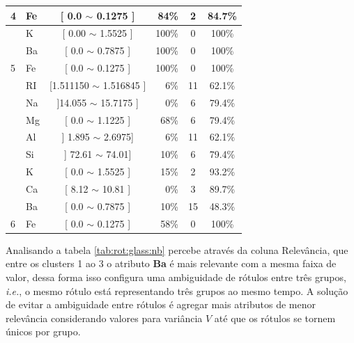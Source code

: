 \begin{table}[!h]
{\begin{tabular}{llcrcc}
\multirow{-5}{*}{4}                          & Fe    & [ 0.0 $\sim$  0.1275 ]    & 84\%  & 2  & 84.7\% \\  \hline                                            
                                            & K     & [ 0.00 $\sim$ 1.5525 ]     & 100\%  & 0 & 100\% \\ 
                                            & Ba     & [ 0.0 $\sim$  0.7875 ]    & 100\%  & 0 & 100\% \\  
\multirow{-3}{*}{5}                         & Fe    & [ 0.0 $\sim$  0.1275 ]     & 100\%  & 0 & 100\% \\  \hline
                                            & RI     & [1.511150 $\sim$  1.516845 ] & 6\%  & 11  & 62.1\% \\ 
                                            & Na     & ]14.055 $\sim$  15.7175 ] & 0\%  & 6  & 79.4\% \\ 
                                             & Mg    & [ 0.0 $\sim$  1.1225 ]    & 68\%  &6  & 79.4\%\\ 
                                             & Al    & ] 1.895 $\sim$  2.6975]      & 6\%  & 11  & 62.1\%\\
                                            & Si    & ] 72.61 $\sim$  74.01]      & 10\%  & 6  & 79.4\%\\
                                            & K     & [  0.0 $\sim$  1.5525 ]    & 15\%  & 2  & 93.2\% \\ 
                                            & Ca     & [ 8.12 $\sim$ 10.81 ]    & 0\%  & 3  & 89.7\% \\ 
                                            & Ba     & [ 0.0 $\sim$  0.7875 ]    & 10\%  & 15  & 48.3\% \\  
\multirow{-3}{*}{6}                         & Fe    & [ 0.0 $\sim$  0.1275 ]     & 58\%  & 0  & 100\% \\  \hline

\end{tabular}
}
\end{table}

Analisando a tabela \ref{tab:rot:glass:nb} percebe através da coluna Relevância, que entre os clusters 1 ao 3 o atributo \textbf{Ba} é mais relevante com a mesma faixa de valor, dessa forma isso configura uma ambiguidade de rótulos entre três grupos, \textit{i.e.}, o mesmo rótulo está representando três grupos ao mesmo tempo. A solução de evitar a ambiguidade entre rótulos é agregar mais atributos de menor relevância considerando valores para variância ${V}$ até que os rótulos se tornem únicos por grupo.


